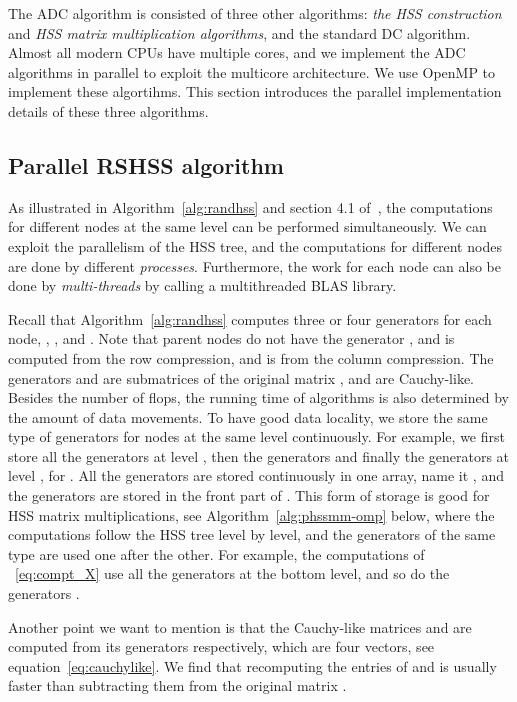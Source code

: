 \documentclass[times]{nlaauth}
\newcounter{algorithm}
\begin{document}
The ADC algorithm is consisted of three other algorithms:
\emph{the HSS construction} and \emph{HSS matrix multiplication algorithms},
and the standard DC algorithm.
Almost all modern CPUs have multiple cores, and we implement the ADC algorithms
in parallel to exploit the multicore architecture.
We use OpenMP to implement these algortihms.
This section introduces the parallel implementation details of these three algorithms.


\subsection{Parallel RSHSS algorithm}

As illustrated in Algorithm~\ref{alg:randhss} and section 4.1 of~\cite{rand-hss}, the computations for
different nodes at the same level can be performed simultaneously.
We can exploit the parallelism of the HSS tree, and
the computations for different nodes are done by different \emph{processes}.
Furthermore, the work for each node can also be done by \emph{multi-threads} by calling
a multithreaded BLAS library.

Recall that Algorithm~\ref{alg:randhss} computes three or four generators for each node,
, ,  and . Note that parent nodes do not have
the generator , and  is computed from the row compression, and
 is from the column compression. The generators  and  are submatrices
of the original matrix , and are Cauchy-like.
Besides the number of flops,
the running time of algorithms is also determined by the amount of data movements.
To have good data locality,
we store the same type of generators for nodes at the same level continuously.
For example, we first store all the generators  at level ,
then the generators  and finally the generators  at level , for .
All the generators are stored continuously in one array, name it , and the
generators  are stored in the front part of .
This form of storage is good for HSS matrix multiplications, see Algorithm~\ref{alg:phssmm-omp} below,
where the computations follow the HSS tree level by level, and
the generators of the same type are used one after the other.
For example, the computations of ~\eqref{eq:compt_X} use all the generators  at the bottom level, and
so do the generators .

Another point we want to mention is that the Cauchy-like matrices  and  are computed
from its generators respectively,
which are four vectors, see equation~\eqref{eq:cauchylike}.
We find that recomputing the entries of  and  is usually faster than subtracting them from
the original matrix .
\end{document}
